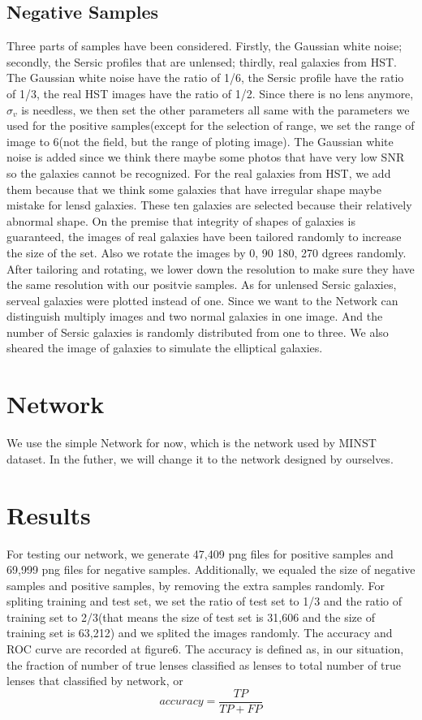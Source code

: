 \documentclass[a4paper,fleqn,usenatbib]{mnras}
\begin{document}
\subsection{Negative Samples}
Three parts of samples have been considered. Firstly, the Gaussian white noise; secondly, the Sersic profiles that are unlensed; thirdly, real galaxies from HST. The Gaussian white noise have the ratio of 1/6, the Sersic profile have the ratio of 1/3, the real HST images have the ratio of 1/2. Since there is no lens anymore, $\sigma_v$ is needless, we then set the other parameters all same with the parameters we used for the positive samples(except for the selection of range, we set the range of image to 6(not the field, but the range of ploting image). 
The Gaussian white noise is added since we think there maybe some photos that have very low SNR so the galaxies cannot be recognized. 
For the real galaxies from HST, we add them because that we think some galaxies that have irregular shape maybe mistake for lensd galaxies. These ten galaxies are selected because their relatively abnormal shape. On the premise that integrity of shapes of galaxies is guaranteed, the images of real galaxies have been tailored randomly to increase the size of the set. Also we rotate the images by 0, 90 180, 270 dgrees randomly. After tailoring and rotating, we lower down the resolution to make sure they have the same resolution with our positvie samples.
As for unlensed Sersic galaxies, serveal galaxies were plotted instead of one. Since we want to the Network can distinguish multiply images and two normal galaxies in one image. And the number of Sersic galaxies is randomly distributed from one to three. We also sheared the image of galaxies to simulate the elliptical galaxies. 
\section{Network}
We use the simple Network for now, which is the network used by MINST dataset. In the futher, we will change it to the network designed by ourselves.
\section{Results}
For testing our network, we generate 47,409 png files for positive samples and 69,999 png files for negative samples. Additionally, we equaled the size of negative samples and positive samples, by removing the extra samples randomly. For spliting training and test set, we set the ratio of test set to 1/3 and the ratio of training set to 2/3(that means the size of test set is 31,606 and the size of training set is 63,212) and we splited the images randomly. The accuracy and ROC curve are recorded at figure6. The accuracy is defined as, in our situation, the fraction of number of true lenses classified as lenses to total number of true lenses that classified by network, or
\begin{equation}
	accuracy = \frac{TP}{TP + FP}
\end{equation}
\end{document}
